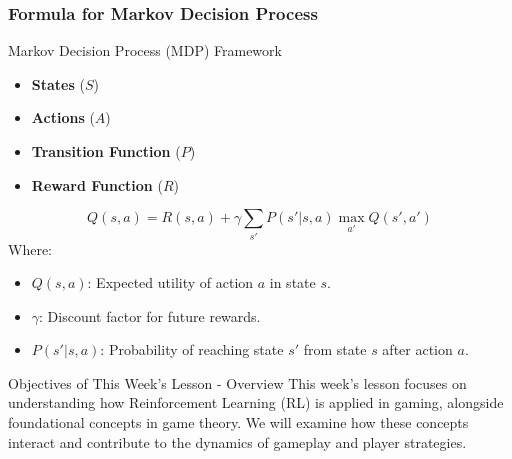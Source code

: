 \documentclass[aspectratio=169]{beamer}
\begin{document}
\begin{frame}[fragile]
    \frametitle{Formula for Markov Decision Process}
    
    \begin{block}{Markov Decision Process (MDP) Framework}
        \begin{itemize}
            \item \textbf{States} ($S$)
            \item \textbf{Actions} ($A$)
            \item \textbf{Transition Function} ($P$)
            \item \textbf{Reward Function} ($R$)
        \end{itemize}
    \end{block}
    
    \begin{equation}
    Q(s, a) = R(s, a) + \gamma \sum_{s'} P(s'|s, a) \max_{a'} Q(s', a')
    \end{equation}
    Where:
    \begin{itemize}
        \item $Q(s, a)$: Expected utility of action $a$ in state $s$.
        \item $\gamma$: Discount factor for future rewards.
        \item $P(s'|s, a)$: Probability of reaching state $s'$ from state $s$ after action $a$.
    \end{itemize}
\end{frame}

\begin{frame}[fragile]{Objectives of This Week's Lesson - Overview}
    This week’s lesson focuses on understanding how Reinforcement Learning (RL) is applied in gaming, alongside foundational concepts in game theory. 
    We will examine how these concepts interact and contribute to the dynamics of gameplay and player strategies.
\end{frame}
\end{document}
